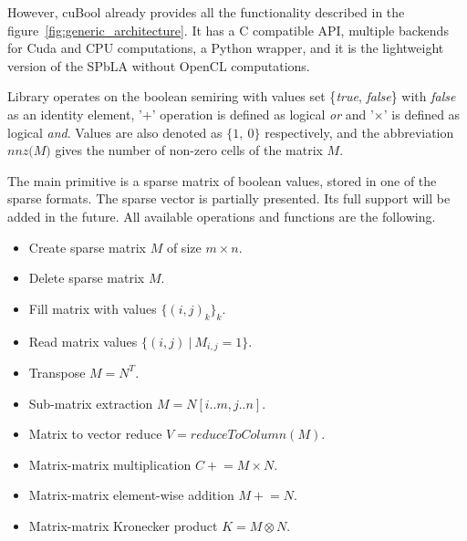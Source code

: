 However, cuBool already provides all the functionality described in the figure~\ref{fig:generic_architecture}.
It has a C compatible API, multiple backends for Cuda and CPU computations, a Python wrapper, and it is the lightweight version of the SPbLA without OpenCL computations.

Library operates on the boolean semiring with values set \{\textit{true}, \textit{false}\} with \textit{false} as an identity element, '$+$' operation is defined as logical \textit{or} and '$\times$' is defined as logical \textit{and}.
Values are also denoted as $\{1,~0\}$ respectively, and the abbreviation $\textit{nnz(M)}$ gives the number of non-zero cells of the matrix $M$.

The main primitive is a sparse matrix of boolean values, stored in one of the sparse formats.
The sparse vector is partially presented. 
Its full support will be added in the future. 
All available operations and functions are the following.


\begin{itemize}
    \item Create sparse matrix $M$ of size $m \times n$.
    \item Delete sparse matrix $M$.
    \item Fill matrix with values $\{(i,j)_k\}_k$.
    \item Read matrix values $\{(i, j)~|~M_{i,j} = 1\}$.
    \item Transpose $M = N^T$.
    \item Sub-matrix extraction $M = N[i..m, j..n]$.
    \item Matrix to vector reduce $V = \textit{reduceToColumn}(M)$.
    \item Matrix-matrix multiplication $C \mathrel{+}= M \times N$.
    \item Matrix-matrix element-wise addition $M \mathrel{+}= N$.
    \item Matrix-matrix Kronecker product $K = M \otimes N$.
\end{itemize}